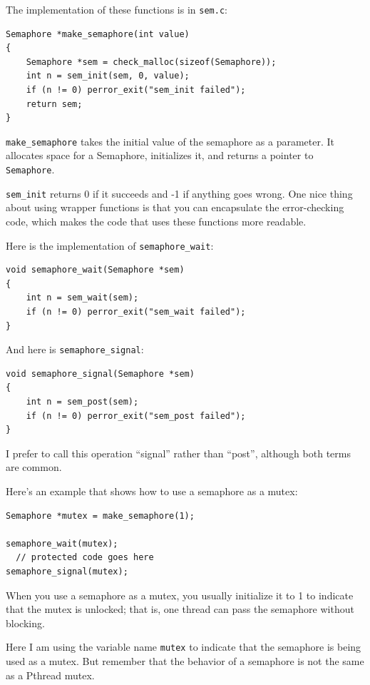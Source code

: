 \documentclass[12pt]{book}
\begin{document}
{The implementation of these functions is in {\tt sem.c}:

\begin{verbatim}
Semaphore *make_semaphore(int value)
{
    Semaphore *sem = check_malloc(sizeof(Semaphore));
    int n = sem_init(sem, 0, value);
    if (n != 0) perror_exit("sem_init failed");
    return sem;
}
\end{verbatim}

{\tt make\_semaphore} takes the initial value of the semaphore
as a parameter.  It allocates space for a Semaphore, initializes
it, and returns a pointer to {\tt Semaphore}.

{\tt sem\_init} returns 0 if it succeeds and -1 if anything goes
wrong.  One nice thing about using wrapper functions is that you can
encapsulate the error-checking code, which makes the code that uses
these functions more readable.

Here is the implementation of \verb"semaphore_wait":

\begin{verbatim}
void semaphore_wait(Semaphore *sem)
{
    int n = sem_wait(sem);
    if (n != 0) perror_exit("sem_wait failed");
}
\end{verbatim}

And here is \verb"semaphore_signal":

\begin{verbatim}
void semaphore_signal(Semaphore *sem)
{
    int n = sem_post(sem);
    if (n != 0) perror_exit("sem_post failed");
}
\end{verbatim}

I prefer to call this operation ``signal'' rather than ``post'',
although both terms are common.

Here's an example that shows how to use a semaphore as a mutex:

\begin{verbatim}
Semaphore *mutex = make_semaphore(1);

semaphore_wait(mutex);
  // protected code goes here
semaphore_signal(mutex);
\end{verbatim}

When you use a semaphore as a mutex, you usually
initialize it to 1 to indicate
that the mutex is unlocked; that is, one thread can
pass the semaphore without blocking.

Here I am using the variable name {\tt mutex} to indicate that
the semaphore is being used as a mutex.  But remember that the behavior
of a semaphore is not the same as a Pthread mutex.


}
\end{document}
